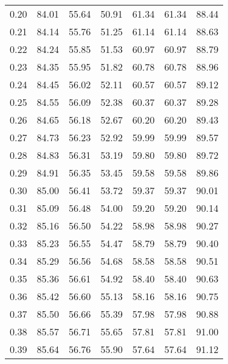 \begin{tabular}{|c|c|c|c|c|c|c|}
      0.20 &     84.01 &     55.64 &      50.91 &   61.34 &      61.34 &         88.44 \\
      0.21 &     84.14 &     55.76 &      51.25 &   61.14 &      61.14 &         88.63 \\
      0.22 &     84.24 &     55.85 &      51.53 &   60.97 &      60.97 &         88.79 \\
      0.23 &     84.35 &     55.95 &      51.82 &   60.78 &      60.78 &         88.96 \\
      0.24 &     84.45 &     56.02 &      52.11 &   60.57 &      60.57 &         89.12 \\
      0.25 &     84.55 &     56.09 &      52.38 &   60.37 &      60.37 &         89.28 \\
      0.26 &     84.65 &     56.18 &      52.67 &   60.20 &      60.20 &         89.43 \\
      0.27 &     84.73 &     56.23 &      52.92 &   59.99 &      59.99 &         89.57 \\
      0.28 &     84.83 &     56.31 &      53.19 &   59.80 &      59.80 &         89.72 \\
      0.29 &     84.91 &     56.35 &      53.45 &   59.58 &      59.58 &         89.86 \\
      0.30 &     85.00 &     56.41 &      53.72 &   59.37 &      59.37 &         90.01 \\
      0.31 &     85.09 &     56.48 &      54.00 &   59.20 &      59.20 &         90.14 \\
      0.32 &     85.16 &     56.50 &      54.22 &   58.98 &      58.98 &         90.27 \\
      0.33 &     85.23 &     56.55 &      54.47 &   58.79 &      58.79 &         90.40 \\
      0.34 &     85.29 &     56.56 &      54.68 &   58.58 &      58.58 &         90.51 \\
      0.35 &     85.36 &     56.61 &      54.92 &   58.40 &      58.40 &         90.63 \\
      0.36 &     85.42 &     56.60 &      55.13 &   58.16 &      58.16 &         90.75 \\
      0.37 &     85.50 &     56.66 &      55.39 &   57.98 &      57.98 &         90.88 \\
      0.38 &     85.57 &     56.71 &      55.65 &   57.81 &      57.81 &         91.00 \\
      0.39 &     85.64 &     56.76 &      55.90 &   57.64 &      57.64 &         91.12 \\

\end{tabular}
